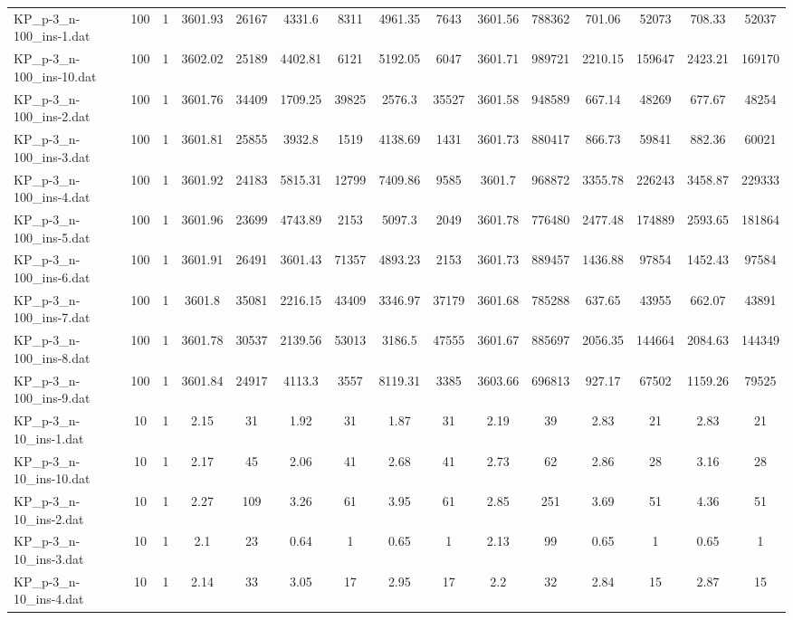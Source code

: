 \begin{table}[!ht]
{\begin{tabular}{lcccccccccccccc}
KP\_p-3\_n-100\_ins-1.dat & 100 & 1 & 3601.93 & 26167 & 4331.6 & 8311 & 4961.35 & 7643 & 3601.56 & 788362 & 701.06 & 52073 & 708.33 & 52037 \\
KP\_p-3\_n-100\_ins-10.dat & 100 & 1 & 3602.02 & 25189 & 4402.81 & 6121 & 5192.05 & 6047 & 3601.71 & 989721 & 2210.15 & 159647 & 2423.21 & 169170 \\
KP\_p-3\_n-100\_ins-2.dat & 100 & 1 & 3601.76 & 34409 & 1709.25 & 39825 & 2576.3 & 35527 & 3601.58 & 948589 & 667.14 & 48269 & 677.67 & 48254 \\
KP\_p-3\_n-100\_ins-3.dat & 100 & 1 & 3601.81 & 25855 & 3932.8 & 1519 & 4138.69 & 1431 & 3601.73 & 880417 & 866.73 & 59841 & 882.36 & 60021 \\
KP\_p-3\_n-100\_ins-4.dat & 100 & 1 & 3601.92 & 24183 & 5815.31 & 12799 & 7409.86 & 9585 & 3601.7 & 968872 & 3355.78 & 226243 & 3458.87 & 229333 \\
KP\_p-3\_n-100\_ins-5.dat & 100 & 1 & 3601.96 & 23699 & 4743.89 & 2153 & 5097.3 & 2049 & 3601.78 & 776480 & 2477.48 & 174889 & 2593.65 & 181864 \\
KP\_p-3\_n-100\_ins-6.dat & 100 & 1 & 3601.91 & 26491 & 3601.43 & 71357 & 4893.23 & 2153 & 3601.73 & 889457 & 1436.88 & 97854 & 1452.43 & 97584 \\
KP\_p-3\_n-100\_ins-7.dat & 100 & 1 & 3601.8 & 35081 & 2216.15 & 43409 & 3346.97 & 37179 & 3601.68 & 785288 & 637.65 & 43955 & 662.07 & 43891 \\
KP\_p-3\_n-100\_ins-8.dat & 100 & 1 & 3601.78 & 30537 & 2139.56 & 53013 & 3186.5 & 47555 & 3601.67 & 885697 & 2056.35 & 144664 & 2084.63 & 144349 \\
KP\_p-3\_n-100\_ins-9.dat & 100 & 1 & 3601.84 & 24917 & 4113.3 & 3557 & 8119.31 & 3385 & 3603.66 & 696813 & 927.17 & 67502 & 1159.26 & 79525 \\
KP\_p-3\_n-10\_ins-1.dat & 10 & 1 & 2.15 & 31 & 1.92 & 31 & 1.87 & 31 & 2.19 & 39 & 2.83 & 21 & 2.83 & 21 \\
KP\_p-3\_n-10\_ins-10.dat & 10 & 1 & 2.17 & 45 & 2.06 & 41 & 2.68 & 41 & 2.73 & 62 & 2.86 & 28 & 3.16 & 28 \\
KP\_p-3\_n-10\_ins-2.dat & 10 & 1 & 2.27 & 109 & 3.26 & 61 & 3.95 & 61 & 2.85 & 251 & 3.69 & 51 & 4.36 & 51 \\
KP\_p-3\_n-10\_ins-3.dat & 10 & 1 & 2.1 & 23 & 0.64 & 1 & 0.65 & 1 & 2.13 & 99 & 0.65 & 1 & 0.65 & 1 \\
KP\_p-3\_n-10\_ins-4.dat & 10 & 1 & 2.14 & 33 & 3.05 & 17 & 2.95 & 17 & 2.2 & 32 & 2.84 & 15 & 2.87 & 15 \\

\end{tabular}}
\end{table}
